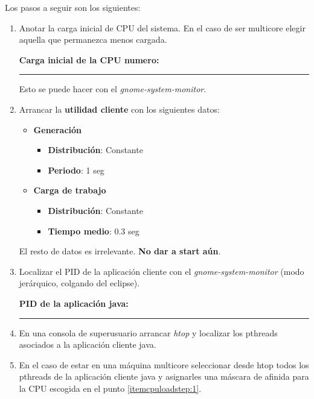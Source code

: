 \documentclass[a4paper,11pt,spanish,twoside]{article}
\begin{document}
Los pasos a seguir son los siguientes:

\begin{enumerate}
\item Anotar la carga inicial de CPU del sistema.  En el caso de ser
  multicore elegir aquella que permanezca menos cargada.\label{itemcpuloadstep:1}

  \textbf{Carga inicial de la CPU numero:} \rule{1in}{.1pt}

  Esto se puede hacer con el \emph{gnome-system-monitor}.

\item Arrancar la \textbf{utilidad cliente} con los siguientes datos:

  \begin{itemize}
  \item \textbf{Generación}

    \begin{itemize}
    \item \textbf{Distribución}:  Constante
    \item \textbf{Periodo}:  1 seg
    \end{itemize}


  \item \textbf{Carga de trabajo}
    \begin{itemize}
    \item \textbf{Distribución}:  Constante

    \item \textbf{Tiempo medio}:  0.3 seg
    \end{itemize}

  \end{itemize}

  El resto de datos es irrelevante.  \textbf{No dar a start aún}.


\item Localizar el PID de la aplicación cliente con el
  \emph{gnome-system-monitor} (modo jerárquico, colgando del
  eclipse).

  \textbf{PID de la aplicación java:} \rule{1in}{.1pt}


\item En una consola de superusuario arrancar \emph{htop} y localizar
  los pthreads asociados a la aplicación cliente java.


\item En el caso de estar en una máquina multicore seleccionar desde
  htop todos los pthreads de la aplicación cliente java y asignarles
  una máscara de afinida para la CPU escogida en el punto
  \ref{itemcpuloadstep:1}.



\end{enumerate}
\end{document}
